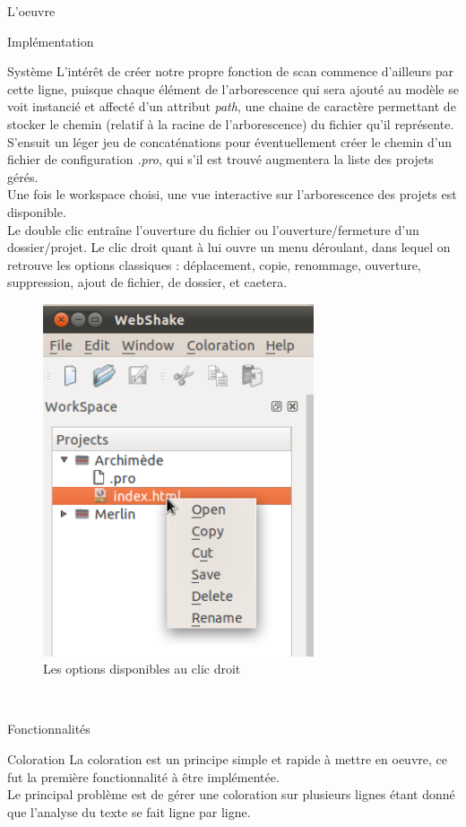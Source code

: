 \documentclass[a4paper, 12pt]{report}
\begin{document}
\begin{part}{L'oeuvre}
\begin{chapter}{Implémentation}
\begin{section}{Système}
				L'intérêt de créer notre propre fonction de scan commence d'ailleurs par cette ligne, puisque chaque élément de l'arborescence qui
				sera ajouté au modèle se voit instancié et affecté d'un attribut \emph{path}, une chaine de caractère permettant de stocker le chemin
				(relatif à la racine de l'arborescence) du fichier qu'il représente.
				S'ensuit un léger jeu de concaténations pour éventuellement créer le chemin d'un fichier de configuration \emph{.pro}, qui s'il est
				trouvé augmentera la liste des projets gérés.\\


				Une fois le workspace choisi, une vue interactive sur l'arborescence des projets est disponible.\\
				Le double clic entraîne l'ouverture du fichier ou l'ouverture/fermeture d'un dossier/projet.
				Le clic droit quant à lui ouvre un menu déroulant, dans lequel on retrouve les options classiques : déplacement, copie, renommage, ouverture, suppression, ajout de fichier, de dossier, et caetera.\\

				\begin{figure}[h]
					\begin{center}
						\includegraphics[width=8cm]{images/interactions.png}
						\caption{Les options disponibles au clic droit}
						\label{flute}
					\end{center}
				\end{figure}~\\
			\end{section}
			\begin{section}{Fonctionnalités}
				\begin{subsection}{Coloration}
					La coloration est un principe simple et rapide à mettre en oeuvre, ce fut la première fonctionnalité à être implémentée.\\
					Le principal problème est de gérer une coloration sur plusieurs lignes étant donné que l'analyse du texte se fait ligne par
					ligne.\\


\end{subsection}
\end{section}
\end{chapter}
\end{part}
\end{document}
